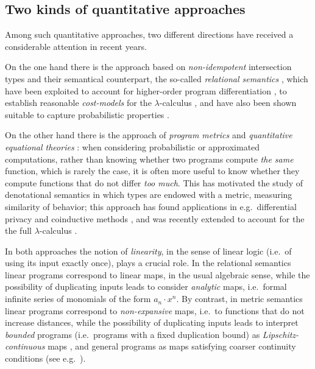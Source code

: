 \documentclass[conference]{IEEEtran}
\begin{document}
\subsection{Two kinds of quantitative approaches}

Among such quantitative approaches, two different directions have received a considerable attention in recent years. 

On the one hand there is the approach based on \emph{non-idempotent} intersection types \cite{} and their semantical counterpart, the so-called \emph{relational semantics} \cite{}, which have been exploited to account for higher-order program differentiation \cite{difflambda}, to establish reasonable \emph{cost-models} for the $\lambda$-calculus \cite{}, and have also been shown suitable to capture probabilistic properties \cite{Manzo}. 

On the other hand there is the approach of \emph{program metrics} \cite{} and \emph{quantitative equational theories} \cite{Mardare}: when considering probabilistic or approximated computations, rather than knowing whether two programs compute \emph{the same} function, which is rarely the case, it is often more useful to know whether they compute functions that do not differ \emph{too much}. This has motivated the study of denotational semantics in which types are endowed with a metric, measuring similarity of behavior; this approach has found  applications in e.g.~differential privacy \cite{} and coinductive methods \cite{}, and was recently extended to account for the the full $\lambda$-calculus \cite{LICS2021, FSCD2022}.

In both approaches the notion of \emph{linearity}, in the sense of linear logic \cite{linearlogic} (i.e.~of using its input exactly once), plays a crucial role.
In the relational semantics linear programs correspond to linear maps, in the usual algebraic sense, while the possibility of duplicating inputs leads to consider \emph{analytic} maps, i.e.~formal infinite series of monomials of the form $a_{n}\cdot x^{n}$.
By contrast, in metric semantics linear programs correspond to \emph{non-expansive} maps, i.e.~to functions that do not increase distances, while the possibility of duplicating inputs leads to interpret \emph{bounded} programs (i.e.~programs with a fixed duplication bound) as \emph{Lipschitz-continuous} maps \cite{Gabo2017}, and general programs as maps satisfying coarser 
continuity conditions (see e.g.~\cite{LICS2021}).
\end{document}
